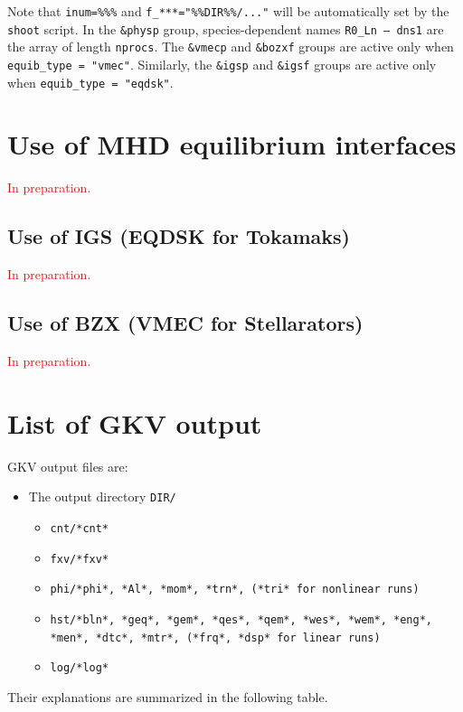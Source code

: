 Note that \texttt{inum=\%\%\%} and \texttt{f\_***="\%\%DIR\%\%/..."} will be automatically set by the \texttt{shoot} script.
In the \texttt{\&physp} group, species-dependent names \texttt{R0\_Ln -- dns1} are the array of length \texttt{nprocs}. The \texttt{\&vmecp} and \texttt{\&bozxf} groups are active only when \texttt{equib\_type = "vmec"}. Similarly, the \texttt{\&igsp} and \texttt{\&igsf} groups are active only when \texttt{equib\_type = "eqdsk"}.





\section{Use of MHD equilibrium interfaces}
\label{sec:Use of MHD equilibrium interfaces}

\textcolor{red}{In preparation.}

\subsection{Use of IGS (EQDSK for Tokamaks)}
\label{sec:Use of IGS}

\textcolor{red}{In preparation.}

\subsection{Use of BZX (VMEC for Stellarators)}
\label{sec:Use of BZX}

\textcolor{red}{In preparation.}




\section{List of GKV output}
\label{sec:List of GKV output}

GKV output files are:
\begin{itemize}
  \item The output directory \texttt{DIR/}
  \begin{itemize}
    \item \texttt{cnt/*cnt*}
    \item \texttt{fxv/*fxv*}
    \item \texttt{phi/*phi*, *Al*, *mom*, *trn*, (*tri* for nonlinear runs)}
    \item \texttt{hst/*bln*, *geq*, *gem*, *qes*, *qem*, *wes*, *wem*, *eng*, *men*, *dtc*, *mtr*, (*frq*, *dsp* for linear runs)}
    \item \texttt{log/*log*}
  \end{itemize}
\end{itemize}
Their explanations are summarized in the following table.


